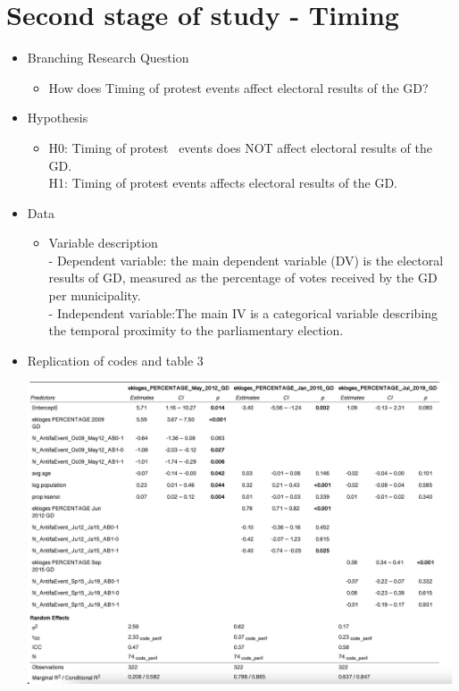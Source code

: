 \documentclass[12pt,letterpaper]{article}
\begin{document}
\section*{Second stage of study - Timing}
\vspace{.25cm}
\begin{itemize}
	\item
	Branching Research Question
	\begin{itemize}
		\item How does Timing of protest events affect electoral results of the GD?
	\end{itemize}
	\item
	Hypothesis
	\begin{itemize}
		\item H0: Timing of protest  events does NOT affect electoral results of the GD.\\
		H1: Timing of protest events affects electoral results of the GD.\\
	\end{itemize}
	\item
	Data
	\begin{itemize}
		\item 
		Variable description\\
		- Dependent variable: the main dependent variable (DV) is the electoral results of GD, measured as the percentage of votes received by the GD per municipality.\\
		- Independent variable:The main IV is a categorical variable describing the temporal proximity to the parliamentary election.\\
	\end{itemize}
	\item 
	Replication of codes and table 3
	\begin{itemize}
		
		\includegraphics[width=0.99\textwidth]{Table_3.png}

\end{itemize}
\end{itemize}
\end{document}
